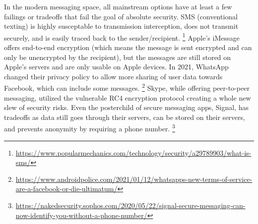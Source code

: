 \documentclass[titlepage]{article}
\begin{document}
    In the modern messaging space, all mainstream options have at least a few failings or tradeoffs that fail the goal of absolute security.
    SMS (conventional texting) is highly susceptable to transmission interception, does not transmit securely, and is easily traced back to the sender/recipient.
    \footnote{\url{https://www.popularmechanics.com/technology/security/a29789903/what-is-sms/}}
    Apple's iMessage offers end-to-end encryption (which means the message is sent encrypted and can only be unencrypted by the recipient), but the messages are still stored on Apple's servers and are only usable on Apple devices.
    In 2021, WhatsApp changed their privacy policy to allow more sharing of user data towards Facebook, which can include some messages.
    \footnote{\url{https://www.androidpolice.com/2021/01/12/whatsapps-new-terms-of-service-are-a-facebook-or-die-ultimatum/}}
    Skype, while offering peer-to-peer messaging, utilized the vulnerable RC4 encryption protocol creating a whole new slew of security risks.
    Even the posterchild of secure messaging apps, Signal, has tradeoffs as data still goes through their servers, can be stored on their servers, and prevents anonymity by requiring a phone number.
    \footnote{\url{https://nakedsecurity.sophos.com/2020/05/22/signal-secure-messaging-can-now-identify-you-without-a-phone-number/}}\\
\end{document}
